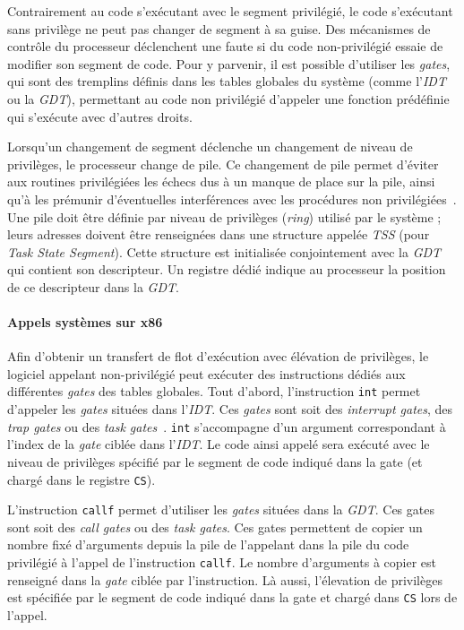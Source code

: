 Contrairement au code s'exécutant avec le segment privilégié, le code s'exécutant sans privilège ne peut pas changer de segment à sa guise. Des mécanismes de contrôle du processeur déclenchent une faute si du code non-privilégié essaie de modifier son segment de code. Pour y parvenir, il est possible d'utiliser les \emph{gates}, qui sont des tremplins définis dans les tables globales du système (comme l'\emph{IDT} ou la \emph{GDT}), permettant au code non privilégié d'appeler une fonction prédéfinie qui s'exécute avec d'autres droits.

Lorsqu'un changement de segment déclenche un changement de niveau de privilèges, le processeur change de pile. Ce changement de pile permet d'éviter aux routines privilégiées les échecs dus à un manque de place sur la pile, ainsi qu'à les prémunir d'éventuelles interférences avec les procédures non privilégiées~\cite{intel_stack_switch}. 
Une pile doit être définie par niveau de privilèges (\emph{ring}) utilisé par le système ; leurs adresses doivent être renseignées dans une structure appelée \emph{TSS} (pour \emph{Task State Segment}). Cette structure est initialisée conjointement avec la \emph{GDT} qui contient son descripteur. Un registre dédié indique au processeur la position de ce descripteur dans la \emph{GDT}.

\paragraph{Appels systèmes sur x86}

Afin d'obtenir un transfert de flot d'exécution avec élévation de privilèges, le logiciel appelant non-privilégié peut exécuter des instructions dédiés aux différentes \emph{gates} des tables globales. Tout d'abord, l'instruction \texttt{int} permet d'appeler les \emph{gates} situées dans l'\emph{IDT}. Ces \emph{gates} sont soit des \emph{interrupt gates}, des \emph{trap gates} ou des \emph{task gates}~\cite{intel_idt_gates}. \texttt{int} s'accompagne d'un argument correspondant à l'index de la \emph{gate} ciblée dans l'\emph{IDT}. Le code ainsi appelé sera exécuté avec le niveau de privilèges spécifié par le segment de code indiqué dans la gate (et chargé dans le registre \texttt{CS}).

L'instruction \texttt{callf} permet d'utiliser les \emph{gates} situées dans la \emph{GDT}. Ces gates sont soit des \emph{call gates} ou des \emph{task gates}. Ces gates permettent de copier un nombre fixé d'arguments depuis la pile de l'appelant dans la pile du code privilégié à l'appel de l'instruction \texttt{callf}. Le nombre d'arguments à copier est renseigné dans la \emph{gate} ciblée par l'instruction. Là aussi, l'élevation de privilèges est spécifiée par le segment de code indiqué dans la gate et chargé dans \texttt{CS} lors de l'appel.

